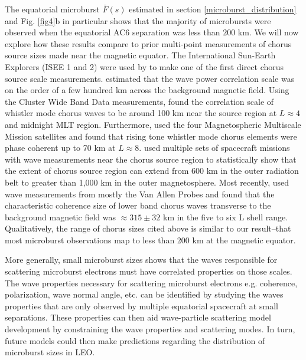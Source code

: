 \documentclass[draft]{agujournal2019}
\begin{document}
The equatorial microburst $\bar{F}(s)$ estimated in section \ref{microburst_distribution} and Fig. \ref{fig4}b in particular shows that the majority of microbursts were observed when the equatorial AC6 separation was less than $200$ km. We will now explore how these results compare to prior multi-point measurements of chorus source sizes made near the magnetic equator. The International Sun-Earth Explorers (ISEE 1 and 2) were used by  to make one of the first direct chorus source scale measurements.  estimated that the wave power correlation scale was on the order of a few hundred km across the background magnetic field. Using the Cluster Wide Band Data measurements,  found the correlation scale of whistler mode chorus waves to be around 100 km near the source region at $L \approx 4$ and midnight MLT region. Furthermore,  used the four Magnetospheric Multiscale Mission satellites and found that rising tone whistler mode chorus elements were phase coherent up to 70 km at $L \approx 8$.  used multiple sets of spacecraft missions with wave measurements near the chorus source region to statistically show that the extent of chorus source region can extend from 600 km in the outer radiation belt to greater than 1,000 km in the outer magnetosphere. Most recently,  used wave measurements from mostly the Van Allen Probes and found that the characteristic coherence size of lower band chorus waves transverse to the background magnetic field was $\approx 315 \pm 32$ km in the five to six L shell range. Qualitatively, the range of chorus sizes cited above is similar to our result--that most microburst observations map to less than 200 km at the magnetic equator.

More generally, small microburst sizes shows that the waves responsible for scattering microburst electrons must have correlated properties on those scales. The wave properties necessary for scattering microburst electrons e.g. coherence, polarization, wave normal angle, etc. can be identified by studying the waves properties that are only observed by multiple equatorial spacecraft at small separations. These properties can then aid wave-particle scattering model development by constraining the wave properties and scattering modes. In turn, future models could then make predictions regarding the distribution of microburst sizes in LEO. 
\end{document}

